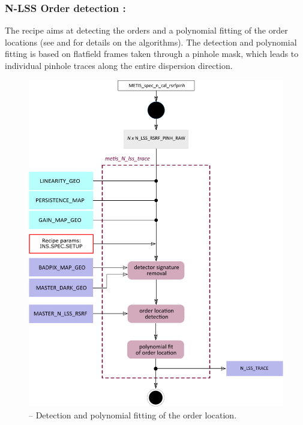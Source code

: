 \clearpage
\subsubsection{N-LSS Order detection :}\label{rec:metis_n_lss_trace}
The recipe \hyperref[rec:metis_n_lss_trace]{} aims at detecting the orders and a polynomial fitting of the order locations (see \cite{pis02} and \cite{pis21} for details on the algorithms). The detection and polynomial fitting is based on flatfield frames taken through a pinhole mask, which leads to individual pinhole traces along the entire dispersion direction.

\begin{figure}[ht]
  \centering
  \includegraphics[width=0.5\textheight]{figures/metis_N_lss_trace_v0.83.pdf}
  \caption[Recipe: ]{ --
    Detection and polynomial fitting of the order location.}
  \label{Fig:rec_N_lss_wave}
\end{figure}

